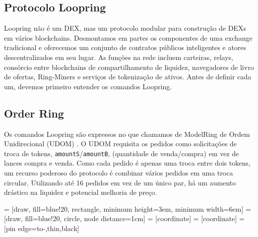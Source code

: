 \documentclass[UTF8,nofonts]{article}
\makeatletter
\newenvironment{figurehere}
 {\def\@captype{figure}}
 {}
\makeatother
\begin{document}
\begin{multicols}{2}
\section{Protocolo Loopring\label{sec:loopring_protocol}}
Loopring não é um DEX, mas um protocolo modular para construção de DEXs em vários blockchains. Desmontamos em partes os componentes de uma exchange tradicional e oferecemos um conjunto de contratos públicos inteligentes e atores descentralizados em seu lugar. As funções na rede incluem carteiras, relays, consórcio entre blockchains de compartilhamento de liquidez, navegadores de livro de ofertas, Ring-Miners e serviços de tokenização de ativos. Antes de definir cada um, devemos primeiro entender os comandos Loopring.

\subsection{Order Ring\label{sec:order_ring}}
Os comandos Loopring são expressos no que chamamos de ModelRing de Ordem Unidirecional (UDOM) \cite{coinport2014udom}. O UDOM requisita os pedidos como solicitações de troca de tokens, \verb|amountS|/\verb|amountB|, (quantidade de venda/compra) em vez de lances compra e venda. Como cada pedido é apenas uma troca entre dois tokens, um recurso poderoso do protocolo é combinar vários pedidos em uma troca circular. Utilizando até 16 pedidos em vez de um único par, há um aumento drástico na liquidez e potencial melhoria de preço.

\begin{center}
\begin{figurehere}
\centering
{} = [draw, fill=blue!20, rectangle, 
    minimum height=3em, minimum width=6em]
 = [draw, fill=blue!20, circle, node distance=1cm]
 = [coordinate]
 = [coordinate]
 = [pin edge={to-,thin,black}]

\end{figurehere}
\end{center}
\end{multicols}
\end{document}
